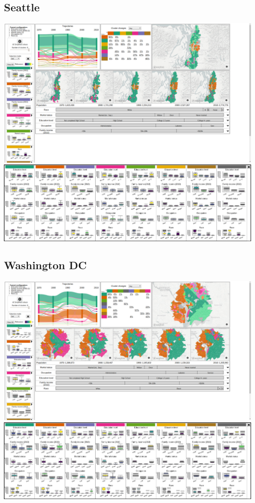\documentclass[a4paper]{article}
\begin{document}
\subsection{Seattle}
\begin{center}
	\includegraphics[width=\linewidth]{37a.png}
	\includegraphics[width=\linewidth]{37b.png}
\end{center} \clearpage



\subsection{Washington DC}
\begin{center}
	\includegraphics[width=\linewidth]{38a.png}
	\includegraphics[width=\linewidth]{38b.png}
\end{center} 
\end{document}
